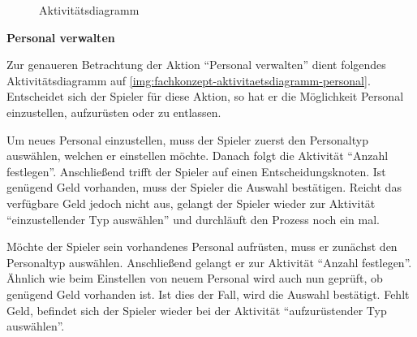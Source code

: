 \begin{figure}[h]
  \centering
  \caption{Aktivitätsdiagramm}
  \label{img:fachkonzept-aktivitaetsdiagramm-uebersicht}
\end{figure}

\medskip

\textbf{Personal verwalten}

Zur genaueren Betrachtung der Aktion “Personal verwalten” dient folgendes Aktivitätsdiagramm auf \vref{img:fachkonzept-aktivitaetsdiagramm-personal}. Entscheidet sich der Spieler für diese Aktion, so hat er die Möglichkeit Personal einzustellen, aufzurüsten oder zu entlassen. 

Um neues Personal einzustellen, muss der Spieler zuerst den Personaltyp auswählen, welchen er einstellen möchte. Danach folgt die Aktivität “Anzahl festlegen”. Anschließend trifft der Spieler auf einen Entscheidungsknoten. Ist genügend Geld vorhanden, muss der Spieler die Auswahl bestätigen. Reicht das verfügbare Geld jedoch nicht aus, gelangt der Spieler wieder zur Aktivität “einzustellender Typ auswählen” und durchläuft den Prozess noch ein mal. 

Möchte der Spieler sein vorhandenes Personal aufrüsten, muss er zunächst den Personaltyp auswählen. Anschließend gelangt er zur Aktivität “Anzahl festlegen”. Ähnlich wie beim Einstellen von neuem Personal wird auch nun geprüft, ob genügend Geld vorhanden ist. Ist dies der Fall, wird die Auswahl bestätigt. Fehlt Geld, befindet sich der Spieler wieder bei der Aktivität “aufzurüstender Typ auswählen”.

